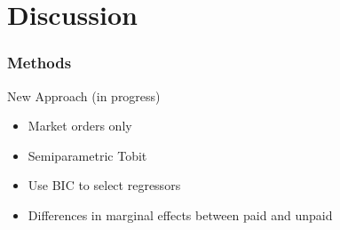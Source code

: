 \documentclass[11pt]{beamer}
\begin{document}
\section{Discussion}


\begin{frame}
\frametitle{Methods}

\begin{block}
	{New Approach (in progress)}
	\begin{itemize}
		\item Market orders only
		\item Semiparametric Tobit
		\item Use BIC to select regressors
		\item Differences in marginal effects between paid and unpaid
	\end{itemize}
\end{block}

\end{frame}
\end{document}
